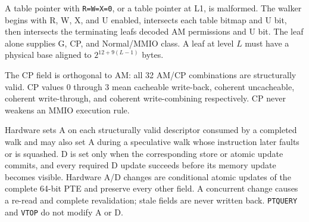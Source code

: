 A table pointer with \texttt{R=W=X=0}, or a table pointer at L1, is malformed.
The walker begins with R, W, X, and U enabled, intersects each table bitmap and
U bit, then intersects the terminating leaf\textquotesingle{}s decoded AM permissions and U bit.
The leaf alone supplies G, CP, and Normal/MMIO class. A leaf at level $L$ must
have a physical base aligned to $2^{12+9(L-1)}$ bytes.

The CP field is orthogonal to AM: all 32 AM/CP combinations are structurally
valid. CP values 0 through 3 mean cacheable write-back, coherent uncacheable,
coherent write-through, and coherent write-combining respectively. CP never
weakens an MMIO execution rule.

Hardware sets A on each structurally valid descriptor consumed by a completed
walk and may also set A during a speculative walk whose instruction later
faults or is squashed. D is set only when the corresponding store or atomic update
commits, and every required D update succeeds before its memory update becomes
visible. Hardware A/D changes are conditional atomic updates of the complete
64-bit PTE and preserve every other field. A concurrent change causes a
re-read and complete revalidation; stale fields are never written back.
\texttt{PTQUERY} and \texttt{VTOP} do not modify A or D.
